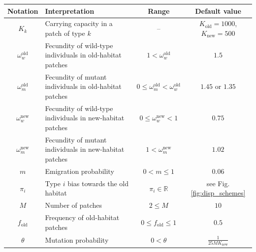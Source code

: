 \documentclass[11pt]{article}
\begin{document}
\linespread{1}
\begin{table}[t!]
	\begin{center}
		\begin{tabular}{c | P{6cm} | c | c}
			\textbf{Notation} & \textbf{Interpretation} & \textbf{Range} & \textbf{Default value} \\
			\hline
			$K_k$ & Carrying capacity in a patch of type $k$ & -- &  \\ 
			$\omega_w^{\text{old}}$ & Fecundity of wild-type individuals in old-habitat patches & $1 < \omega^\text{old}_w$ & $1.5$\\
			$\omega_m^{\text{old}}$ & Fecundity of mutant individuals in old-habitat patches & $0\leq \omega^\text{old}_m < \omega^\text{old}_w$ & $1.45$ or $1.35$\\
			$\omega_w^{\text{new}}$ & Fecundity of wild-type individuals in new-habitat patches & $0\leq \omega^\text{new}_w < 1$ & $0.75$\\
			$\omega_m^{\text{new}}$ & Fecundity of mutant individuals in new-habitat patches & $1 < \omega^\text{new}_m$ & $1.02$\\
%		
			$m$ & Emigration probability & $0<m\leq 1$ & $0.06$\\
			$\pi_i$ & Type $i$ bias towards the old habitat & $\pi_i\in\mathbb{R}$ & see Fig.\ref{fig:disp_schemes}\\
			$M$ & Number of patches & $2\leq M$ & $10$\\
			$f_{\text{old}}$ & Frequency of old-habitat patches & $0\leq f_{\text{old}}\leq 1$ & $0.5$ \\
			$\theta$ & Mutation probability & $0 < \theta$ & $\frac{1}{25 M K_{\text{new}}}$\\

\end{tabular}
\end{center}
\end{table}
\end{document}
